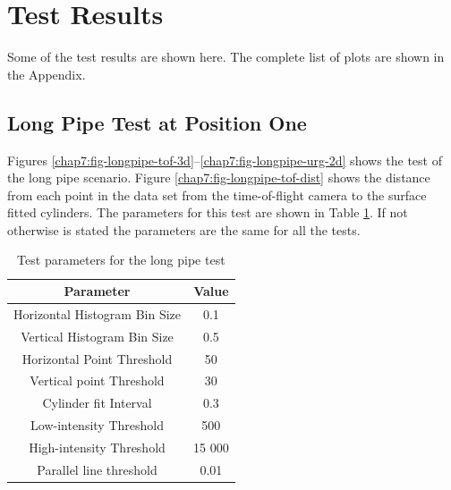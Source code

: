 \section{Test Results}
Some of the test results are shown here. The complete list of plots are shown in the Appendix. 

\subsection{Long Pipe Test at Position One}
Figures \ref{chap7:fig-longpipe-tof-3d}--\ref{chap7:fig-longpipe-urg-2d} shows the test of
the long pipe scenario. Figure \ref{chap7:fig-longpipe-tof-dist} shows the distance from each
point in the data set from the time-of-flight camera to the surface fitted cylinders. The
parameters for this test are shown in Table \ref{chap7:tab-longpipe}. If not otherwise is
stated the parameters are the same for all the tests. 
\begin{table}[htbp]
    \centering
    \begin{tabular}{|c|c|}
        \hline
        Parameter   &   Value   \\
        \hline
        Horizontal Histogram Bin Size & 0.1 \\
        Vertical Histogram Bin Size & 0.5 \\
        Horizontal Point Threshold & 50 \\
        Vertical point Threshold & 30 \\
        \hline
        Cylinder fit Interval & 0.3 \\
        Low-intensity Threshold & 500 \\
        High-intensity Threshold & 15 000 \\
        \hline
        Parallel line threshold & 0.01 \\
        \hline
    \end{tabular}
    \caption{Test parameters for the long pipe test}
    \label{chap7:tab-longpipe}
\end{table}
